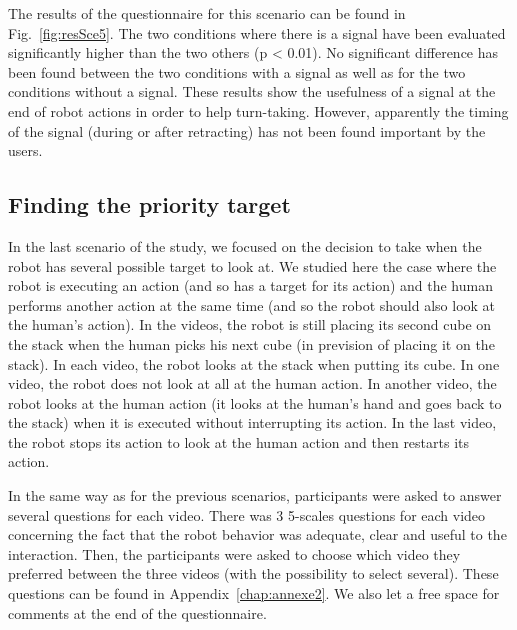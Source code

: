\documentclass[english,a4paper,11pt,twoside]{StyleThese}
\begin{document}
The results of the questionnaire for this scenario can be found in Fig.~\ref{fig:resSce5}. The two conditions where there is a signal have been evaluated significantly higher than the two others (p < 0.01). No significant difference has been found between the two conditions with a signal as well as for the two conditions without a signal. These results show the usefulness of a signal at the end of robot actions in order to help turn-taking. However, apparently the timing of the signal (during or after retracting) has not been found important by the users. 

\subsection{Finding the priority target}

In the last scenario of the study, we focused on the decision to take when the robot has several possible target to look at. We studied here the case where the robot is executing an action (and so has a target for its action) and the human performs another action at the same time (and so the robot should also look at the human's action). In the videos, the robot is still placing its second cube on the stack when the human picks his next cube (in prevision of placing it on the stack). In each video, the robot looks at the stack when putting its cube. In one video, the robot does not look at all at the human action. In another video, the robot looks at the human action (it looks at the human's hand and goes back to the stack) when it is executed without interrupting its action. In the last video, the robot stops its action to look at the human action and then restarts its action.

In the same way as for the previous scenarios, participants were asked to answer several questions for each video. There was 3 5-scales questions for each video concerning the fact that the robot behavior was adequate, clear and useful to the interaction. Then, the participants were asked to choose which video they preferred between the three videos (with the possibility to select several). These questions can be found in Appendix~\ref{chap:annexe2}. We also let a free space for comments at the end of the questionnaire.
\end{document}
